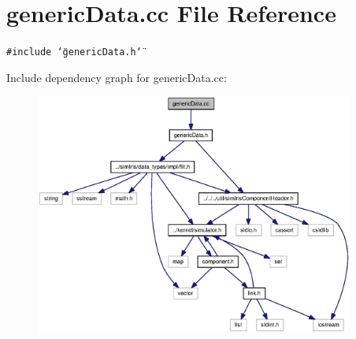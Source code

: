 \section{genericData.cc File Reference}
\label{genericData_8cc}
{\tt \#include \char`\"{}genericData.h\char`\"{}}\par


Include dependency graph for genericData.cc:\nopagebreak
\begin{figure}[H]
\begin{center}
\leavevmode
\includegraphics[width=297pt]{genericData_8cc__incl}
\end{center}
\end{figure}
